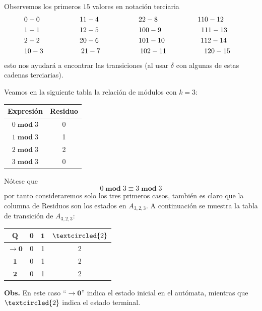 \documentclass{article}
\begin{document}
\begin{enumerate}
  Observemos los primeros $15$ valores en notación terciaria
  \begin{eqnarray*}
    &0 - 0 \hspace*{2cm} 11 - 4 \hspace*{2cm} 22 - 8 \hspace*{2cm} 110 - 12&\\
    &1 - 1 \hspace*{2cm} 12 - 5 \hspace*{2cm} 100 - 9 \hspace*{2cm} 111 - 13&\\
    &2 - 2 \hspace*{2cm} 20 - 6 \hspace*{2cm} 101 - 10 \hspace*{1.8cm} 112 - 14&\\
    &10 - 3 \hspace*{1.9cm} 21 - 7 \hspace*{2cm} 102 - 11 \hspace*{1.9cm} 120 - 15&
  \end{eqnarray*}
  esto nos ayudará a encontrar las transiciones (al usar $\delta$ con
  algunas de estas cadenas terciarias).

  Veamos en la siguiente tabla la relación de módulos con $k = 3$:
  \begin{center}
    \begin{tabular}{| c | c |}
      \hline
      Expresión & Residuo \\ \hline
      $0\; \mathbf{mod}\; 3$ & 0 \\
      $1\; \mathbf{mod}\; 3$ & 1 \\
      $2\; \mathbf{mod}\; 3$ & 2\\
      $3\; \mathbf{mod}\; 3$ & 0\\\hline
    \end{tabular} 
  \end{center}
  Nótese que
  \[
  0\; \mathbf{mod}\; 3 \equiv 3\; \mathbf{mod}\; 3
  \]
  por tanto consideraremos solo los tres primeros casos,
  también es claro que la columna de Residuos son los estados
  en $A_{3, 2, 3}$. A continuación se muestra la tabla de
  transición de $A_{3, 2, 3}$:
  \begin{center}
    \begin{tabular}{| c | c | c | c |}
      \hline
      $\mathbf{Q}$ & $\mathbf{0}$ & $\mathbf{1}$ & $\textcircled{2}$\\ \hline
      $\rightarrow \mathbf{0}$ & 0 & 1 & 2 \\
      $\mathbf{1}$ & 0 & 1 & 2 \\
      $\mathbf{2}$ & 0 & 1 & 2 \\\hline
    \end{tabular} 
  \end{center}
  \textbf{Obs.} En este caso ``$\rightarrow \mathbf{0}$'' indica el estado inicial
  en el autómata, mientras que $\textcircled{2}$ indica el estado terminal.


\end{enumerate}
\end{document}
